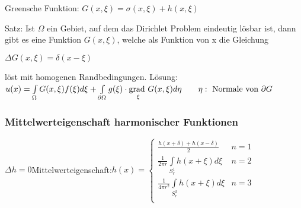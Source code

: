 Greensche Funktion: $G(x,\xi)=\sigma(x,\xi)+h(x,\xi)$

Satz: Ist $\Omega$ ein Gebiet, auf dem das Dirichlet Problem eindeutig lösbar ist, dann gibt es eine Funktion $G(x,\xi)$, welche als Funktion von x die Gleichung

$\Delta G(x,\xi)=\delta(x-\xi)$

löst mit homogenen Randbedingungen.
Lösung: $u(x)=\int\limits_{\Omega}^{}{G(x,\xi)f(\xi)d\xi}+\int\limits_{\partial\Omega}g(\xi)\cdot\underset{\xi}{\mathrm{grad~}}G(x,\xi)d\eta\qquad \eta:\text{ Normale von }\partial G$

\subsubsection{Mittelwerteigenschaft harmonischer Funktionen}

$\Delta h=0$\qquad Mittelwerteigenschaft:\qquad $h(x)=
\begin{cases}
	\frac{h(x+\delta)+h(x-\delta)}{2}& n=1 \\ 
	\frac 1{2\pi r} \int\limits_{S_r^1}{h(x+\xi)d\xi} & n=2\\
	\frac 1{4\pi r^2} \int\limits_{S_r^2}{h(x+\xi)d\xi} & n=3\\
\end{cases}$